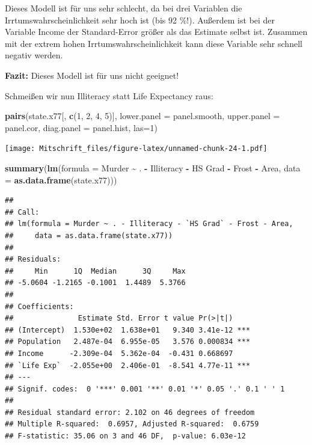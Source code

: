 \documentclass[
]{article}
\newenvironment{Shaded}{\begin{snugshade}}{\end{snugshade}}
\newcommand{\AttributeTok}[1]{\textcolor[rgb]{0.13,0.29,0.53}{#1}}
\newcommand{\DecValTok}[1]{\textcolor[rgb]{0.00,0.00,0.81}{#1}}
\newcommand{\FunctionTok}[1]{\textcolor[rgb]{0.13,0.29,0.53}{\textbf{#1}}}
\newcommand{\NormalTok}[1]{#1}
\newcommand{\SpecialCharTok}[1]{\textcolor[rgb]{0.81,0.36,0.00}{\textbf{#1}}}
\newcommand{\StringTok}[1]{\textcolor[rgb]{0.31,0.60,0.02}{#1}}
\begin{document}
Dieses Modell ist für uns sehr schlecht, da bei drei Variablen die
Irrtumswahrscheinlichkeit sehr hoch ist (bis 92 \%!). Außerdem ist bei
der Variable Income der Standard-Error größer als das Estimate selbst
ist. Zusammen mit der extrem hohen Irrtumswahrscheinlichkeit kann diese
Variable sehr schnell negativ werden.

\tcolorbox

\textbf{Fazit:} Dieses Modell ist für uns nicht geeignet! \endtcolorbox

Schmeißen wir nun Illiteracy statt Life Expectancy raus:

\begin{Shaded}
\begin{Highlighting}[]
\FunctionTok{pairs}\NormalTok{(state.x77[, }\FunctionTok{c}\NormalTok{(}\DecValTok{1}\NormalTok{, }\DecValTok{2}\NormalTok{, }\DecValTok{4}\NormalTok{, }\DecValTok{5}\NormalTok{)], }\AttributeTok{lower.panel =}\NormalTok{ panel.smooth, }\AttributeTok{upper.panel =}\NormalTok{ panel.cor,}
\AttributeTok{diag.panel =}\NormalTok{ panel.hist, }\AttributeTok{las=}\DecValTok{1}\NormalTok{)}
\end{Highlighting}
\end{Shaded}

\texttt{[image: Mitschrift\_files/figure-latex/unnamed-chunk-24-1.pdf]}

\clearpage

\begin{Shaded}
\begin{Highlighting}[]
\FunctionTok{summary}\NormalTok{(}\FunctionTok{lm}\NormalTok{(}\AttributeTok{formula =}\NormalTok{ Murder }\SpecialCharTok{\textasciitilde{}}\NormalTok{ .  }\SpecialCharTok{{-}}\NormalTok{ Illiteracy }\SpecialCharTok{{-}} \StringTok{\textasciigrave{}}\AttributeTok{HS Grad}\StringTok{\textasciigrave{}} \SpecialCharTok{{-}}\NormalTok{ Frost }\SpecialCharTok{{-}}\NormalTok{ Area,}
           \AttributeTok{data =} \FunctionTok{as.data.frame}\NormalTok{(state.x77)))}
\end{Highlighting}
\end{Shaded}

\begin{verbatim}
## 
## Call:
## lm(formula = Murder ~ . - Illiteracy - `HS Grad` - Frost - Area, 
##     data = as.data.frame(state.x77))
## 
## Residuals:
##     Min      1Q  Median      3Q     Max 
## -5.0604 -1.2165 -0.1001  1.4489  5.3766 
## 
## Coefficients:
##               Estimate Std. Error t value Pr(>|t|)    
## (Intercept)  1.530e+02  1.638e+01   9.340 3.41e-12 ***
## Population   2.487e-04  6.955e-05   3.576 0.000834 ***
## Income      -2.309e-04  5.362e-04  -0.431 0.668697    
## `Life Exp`  -2.055e+00  2.406e-01  -8.541 4.77e-11 ***
## ---
## Signif. codes:  0 '***' 0.001 '**' 0.01 '*' 0.05 '.' 0.1 ' ' 1
## 
## Residual standard error: 2.102 on 46 degrees of freedom
## Multiple R-squared:  0.6957, Adjusted R-squared:  0.6759 
## F-statistic: 35.06 on 3 and 46 DF,  p-value: 6.03e-12
\end{verbatim}
\end{document}
